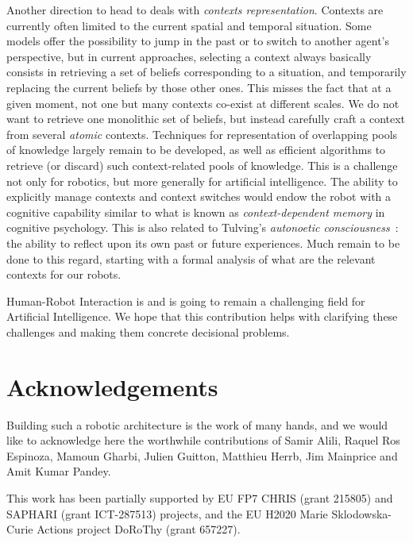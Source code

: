 \documentclass[preprint,3p,times]{elsarticle}
\begin{document}
Another direction to head to deals with \emph{contexts representation}.
Contexts are currently often limited to the current spatial and temporal
situation. Some models offer the possibility to jump in the past or to switch to
another agent's perspective, but in current approaches, selecting a context
always basically consists in retrieving a set of beliefs corresponding to a
situation, and temporarily replacing the current beliefs by those other ones.
This misses the fact that at a given moment, not one but many contexts co-exist
at different scales. We do not want to retrieve one monolithic set of beliefs,
but instead carefully craft a context from several \emph{atomic} contexts.
Techniques for representation of overlapping pools of knowledge largely remain
to be developed, as well as efficient algorithms to retrieve (or discard) such
context-related pools of knowledge. This is a challenge not only for robotics,
but more generally for artificial intelligence.  The ability to explicitly
manage contexts and context switches would endow the robot with a cognitive
capability similar to what is known as \emph{context-dependent memory} in
cognitive psychology. This is also related to Tulving's \emph{autonoetic
consciousness}~\cite{Tulving1985a}: the ability to reflect upon its own past or
future experiences.  Much remain to be done to this regard, starting with a
formal analysis of what are the relevant contexts for our robots.

Human-Robot Interaction is and is going to remain a challenging field for
Artificial Intelligence. We hope that this contribution helps with clarifying
these challenges and making them concrete decisional problems. 

\section*{Acknowledgements}

Building such a robotic architecture is the work of many hands, and we would
like to acknowledge here the worthwhile contributions of Samir Alili, Raquel Ros
Espinoza, Mamoun Gharbi, Julien Guitton, Matthieu Herrb, Jim Mainprice and Amit
Kumar Pandey.

This work has been partially supported by EU FP7 CHRIS (grant 215805) and
SAPHARI (grant ICT-287513) projects, and the EU H2020 Marie Sklodowska-Curie
Actions project DoRoThy (grant 657227).




%

\end{document}
